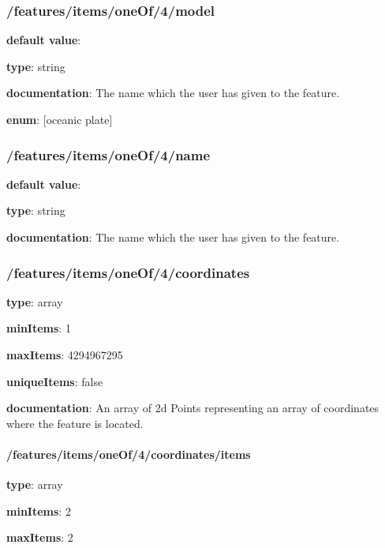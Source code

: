 \subsubsection{/features/items/oneOf/4/model} \begin{itemized}
\item {\bf default value}: 
\item {\bf type}: string
\item {\bf documentation}: The name which the user has given to the feature.
\item {\bf enum}: [oceanic plate]\end{itemized}\subsubsection{/features/items/oneOf/4/name} \begin{itemized}
\item {\bf default value}: 
\item {\bf type}: string
\item {\bf documentation}: The name which the user has given to the feature.
\end{itemized}\subsubsection{/features/items/oneOf/4/coordinates} \begin{itemized}
\item {\bf type}: array
\item {\bf minItems}: 1
\item {\bf maxItems}: 4294967295
\item {\bf uniqueItems}: false
\item {\bf documentation}: An array of 2d Points representing an array of coordinates where the feature is located.
\paragraph{/features/items/oneOf/4/coordinates/items} \begin{itemized}
\item {\bf type}: array
\item {\bf minItems}: 2
\item {\bf maxItems}: 2

\end{itemized}
\end{itemized}
